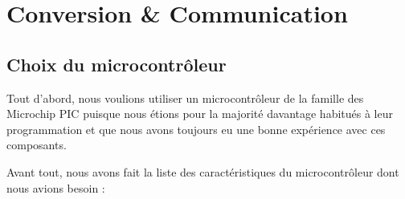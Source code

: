 \documentclass[11pt, french]{article} %
\begin{document}
\section{Conversion \& Communication}
\subsection{Choix du microcontrôleur}

Tout d'abord, nous voulions utiliser un microcontrôleur de la famille des Microchip PIC puisque nous étions pour la majorité davantage habitués à leur programmation et que nous avons toujours eu une bonne expérience avec ces composants. %







Avant tout, nous avons fait la liste des caractéristiques du microcontrôleur dont nous avions besoin :
\end{document}
